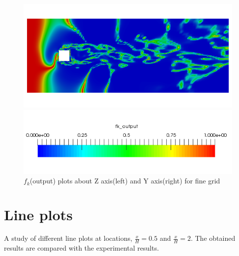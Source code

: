 \begin{figure}[H]
\begin{minipage}[b]{0.5\linewidth}
\end{minipage}
\begin{minipage}[b]{0.5\linewidth}
\includegraphics[scale=0.25]{figure/fine/one/fkout_y.png}
\caption*{}
\end{minipage}
\begin{center}
 \includegraphics[scale=0.5]{figure/fk_scale.png}
\end{center}
\caption{$f_k$(output) plots about Z axis(left) and Y axis(right) for fine grid}
\label{fig:47}
\end{figure}



\section{Line plots}
A study of different line plots at locations, \(\frac{x}{H}=0.5\) and \(\frac{x}{H}=2\). The obtained results are compared with the experimental results. 


